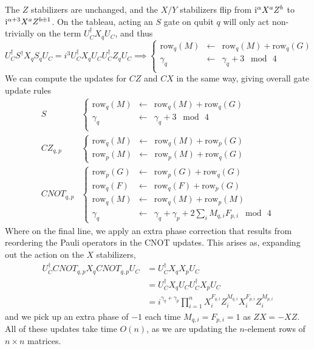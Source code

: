 The $Z$ stabilizers are unchanged, and the $X/Y$ stabilizers flip from $\mathrm{i}^{\alpha}X^{a}Z^{b}$ to $\mathrm{i}^{\alpha+3}X^{a}Z^{b\oplus 1}$. On the tableau, acting an $S$ gate on qubit $q$ will only act non-trivially on the term $U_{C}^{\dagger}X_{q}U_{C}$, and thus
\[
U_{C}^{\dagger}S^{\dagger}X_{q}S_{q}U_{C} = i^{3}U_{C}^{\dagger}X_{q}U_{C}U_{C}^{\dagger}Z_{q}U_{C} \implies \left\{
\begin{array}{rcl}
\text{row}_{q}(M)  & \gets & \text{row}_{q}(M)+\text{row}_{q}(G) \\
\gamma_{q} & \gets & \gamma_{q} + 3\;\bmod\,4 \\
\end{array}\right.
\]
We can compute the updates for $CZ$ and $CX$ in the same way, giving overall gate update rules
\begin{align}
S & \left\{
\begin{array}{rcl}
\text{row}_{q}(M)  & \gets & \text{row}_{q}(M)+\text{row}_{q}(G) \\
\gamma_{q} & \gets & \gamma_{q} + 3\;\bmod\,4 \\
\end{array}\right. \nonumber \\
CZ_{q,p} & \left\{
\begin{array}{rcl}
\text{row}_{q}(M) & \gets & \text{row}_{q}(M) + \text{row}_{p}(G) \\
\text{row}_{p}(M) & \gets & \text{row}_{p}(M) + \text{row}_{q}(G)
\end{array} \right. \nonumber \\ 
CNOT_{q,p} & \left\{
\begin{array}{rcl}
\text{row}_{p}(G) & \gets & \text{row}_{p}(G) + \text{row}_{q}(G)\\
\text{row}_{q}(F) & \gets & \text{row}_{q}(F) + \text{row}_{p}(G)\\
\text{row}_{q}(M) & \gets & \text{row}_{q}(M) + \text{row}_{p}(M)\\
\gamma_{q} & \gets & \gamma_{q}+\gamma_{p} + 2 \sum_{i}M_{q,i}F_{p,i} \;\bmod\,4
\end{array}\right.
\end{align}
Where on the final line, we apply an extra phase correction that results from reordering the Pauli operators in the CNOT updates. This arises as, expanding out the action on the $X$ stabilizers,
\begin{align*}
U_{C}^{\dagger}CNOT_{q,p}X_{q}CNOT_{q,p}U_{C} &= U_{C}^{\dagger}X_{q}X_{p}U_{C} \\
&= U_{C}^{\dagger}X_{q}U_{C}U_{C}^{\dagger}X_{p}U_{C} \\
&= i^{\gamma_{q}+\gamma_{p}}\prod_{i=1}^{n}X_{i}^{F_{q,i}}Z_{i}^{M_{q,i}}X_{i}^{F_{p,i}}Z_{i}^{M_{p,i}}
\end{align*}
and we pick up an extra phase of $-1$ each time $M_{q,i}=F_{p,i}=1$ as $ZX=-XZ$. All of these updates take time $O(n)$, as we are updating the $n$-element rows of $n\times n$ matrices.
